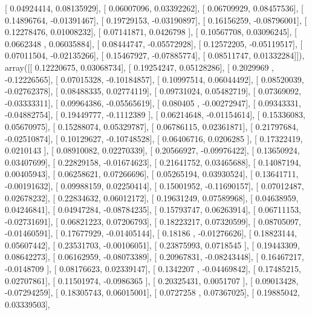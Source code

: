 \documentclass{article}
\begin{document}
       [ 0.04924414,  0.08135929],
       [ 0.06007096,  0.03392262],
       [ 0.06709929,  0.08457536],
       [ 0.14896764, -0.01391467],
       [ 0.19729153, -0.03190897],
       [ 0.16156259, -0.08796001],
       [ 0.12278476,  0.01008232],
       [ 0.07141871,  0.0426798 ],
       [ 0.10567708,  0.03096245],
       [ 0.0662348 ,  0.06035884],
       [ 0.08444747, -0.05572928],
       [ 0.12572205, -0.05119517],
       [ 0.07011504, -0.02135266],
       [ 0.15467927, -0.07885774],
       [ 0.08511747,  0.01332284]]), array([[ 0.12220675,  0.03068734],
       [ 0.19254247,  0.05128286],
       [ 0.2029969 , -0.12226565],
       [ 0.07015328, -0.10184857],
       [ 0.10997514,  0.06044492],
       [ 0.08520039, -0.02762378],
       [ 0.08488335,  0.02774119],
       [ 0.09731024,  0.05482719],
       [ 0.07369092, -0.03333311],
       [ 0.09964386, -0.05565619],
       [ 0.080405  , -0.00272947],
       [ 0.09343331, -0.04882754],
       [ 0.19449777, -0.1112389 ],
       [ 0.06214648, -0.01154614],
       [ 0.15336083,  0.05670975],
       [ 0.15288074,  0.05329787],
       [ 0.06786115,  0.02361871],
       [ 0.21797684, -0.02510874],
       [ 0.10129627, -0.10748528],
       [ 0.06406716,  0.0206285 ],
       [ 0.17322419,  0.0210143 ],
       [ 0.08910082,  0.02270339],
       [ 0.20566927, -0.09976422],
       [ 0.13650924,  0.03407699],
       [ 0.22829158, -0.01674623],
       [ 0.21641752,  0.03465688],
       [ 0.14087194,  0.00405943],
       [ 0.06258621,  0.07266696],
       [ 0.05265194,  0.03930524],
       [ 0.13641711, -0.00191632],
       [ 0.09988159,  0.02250414],
       [ 0.15001952, -0.11690157],
       [ 0.07012487,  0.02678232],
       [ 0.22834632,  0.06012172],
       [ 0.19631249,  0.07589968],
       [ 0.04638959,  0.04246841],
       [ 0.04947284, -0.08784235],
       [ 0.15793747,  0.06263914],
       [ 0.06711153, -0.02731691],
       [ 0.06821223,  0.07206793],
       [ 0.18223217,  0.07320599],
       [ 0.08705097, -0.01460591],
       [ 0.17677929, -0.01405144],
       [ 0.18186   , -0.01276626],
       [ 0.18823144,  0.05607442],
       [ 0.23531703, -0.00106051],
       [ 0.23875993,  0.0718545 ],
       [ 0.19443309,  0.08642273],
       [ 0.06162959, -0.08073389],
       [ 0.20967831, -0.08243448],
       [ 0.16467217, -0.0148709 ],
       [ 0.08176623,  0.02339147],
       [ 0.1342207 , -0.04469842],
       [ 0.17485215,  0.02707861],
       [ 0.11501974, -0.0986365 ],
       [ 0.20325431,  0.0051707 ],
       [ 0.09013428, -0.07294259],
       [ 0.18305743,  0.06015001],
       [ 0.0727258 ,  0.07367025],
       [ 0.19885042,  0.03339503],
\end{document}
